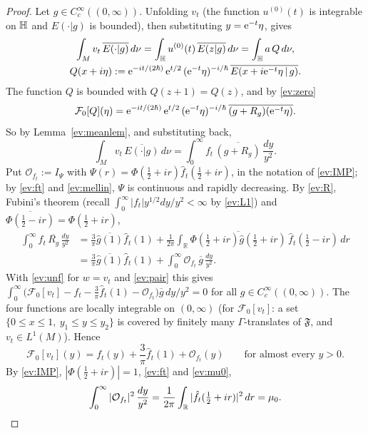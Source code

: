 \begin{proof}
Let $g\in C_c^\infty((0,\infty))$. Unfolding $v_t$ (the function $u^{(0)}(t)$ is integrable on $\mathbb{H}$ and $E(\cdot|g)$ is bounded), then substituting
$y=\mathrm{e}^{-t}\eta$, gives
\begin{gather*}
  \int_Mv_t\,\overline{E(\cdot|g)}\,d\nu=\int_{\mathbb{H}} u^{(0)}(t)\,\overline{E(z|g)}\,d\nu=\int_{\mathbb{H}} a\,Q\,d\nu,\\
  Q(x+i\eta):=\mathrm{e}^{-it/(2\hbar)}\,\mathrm{e}^{t/2}\,(\mathrm{e}^{-t}\eta)^{-i/\hbar}\,\overline{E(x+i\mathrm{e}^{-t}\eta\,|\,g)} .
\end{gather*}
The function $Q$ is bounded with $Q(z+1)=Q(z)$, and by \eqref{ev:zero}
\[
  \mathcal F_0[Q](\eta)=\mathrm{e}^{-it/(2\hbar)}\,\mathrm{e}^{t/2}\,(\mathrm{e}^{-t}\eta)^{-i/\hbar}\,\overline{(g+R_g)(\mathrm{e}^{-t}\eta)} .
\]
So by
Lemma~\ref{ev:meanlem}, and substituting back,
\begin{equation}\label{ev:pair}
  \int_Mv_t\,\overline{E(\cdot|g)}\,d\nu=\int_0^\infty f_t\,\overline{(g+R_g)}\,\frac{dy}{y^2}.
\end{equation}
Put $\mathcal O_{f_t}:=I_\Psi$ with $\Psi(r)=\Phi(\tfrac12+ir)\hat f_t(\tfrac12+ir)$, in the notation of \eqref{ev:IMP}; by \eqref{ev:ft} and \eqref{ev:mellin}, $\Psi$ is continuous and
rapidly decreasing. By \eqref{ev:R}, Fubini's theorem (recall $\int_0^\infty|f_t|y^{1/2}dy/y^2<\infty$ by \eqref{ev:L1}) and $\overline{\Phi(\tfrac12-ir)}=\Phi(\tfrac12+ir)$,
\begin{align*}
  \int_0^\infty f_t\,\overline{R_g}\,\frac{dy}{y^2}&=\frac3\pi\overline{\hat g(1)}\hat f_t(1)+\frac1{2\pi}\int_{\mathbb R}\overline{\Phi(\tfrac12+ir)\hat g(\tfrac12+ir)}\,\hat f_t(\tfrac12-ir)\,dr\\
  &=\frac3\pi\overline{\hat g(1)}\hat f_t(1)+\int_0^\infty\mathcal O_{f_t}\,\overline g\,\frac{dy}{y^2}.
\end{align*}
With \eqref{ev:unf} for $w=v_t$ and \eqref{ev:pair} this gives
$\int_0^\infty\bigl(\mathcal F_0[v_t]-f_t-\tfrac3\pi\hat f_t(1)-\mathcal O_{f_t}\bigr)\overline g\,dy/y^2=0$ for all $g\in C_c^\infty((0,\infty))$. The four functions are locally
integrable on $(0,\infty)$ (for $\mathcal F_0[v_t]$: a set $\{0\le x\le1,\ y_1\le y\le y_2\}$ is covered by finitely many $\Gamma$-translates of $\mathfrak F$, and
$v_t\in L^1(M)$). Hence
\begin{equation}\label{ev:c0}
  \mathcal F_0[v_t](y)=f_t(y)+\frac3\pi\hat f_t(1)+\mathcal O_{f_t}(y)\qquad\text{for almost every }y>0 .
\end{equation}
By \eqref{ev:IMP}, $|\Phi(\tfrac12+ir)|=1$, \eqref{ev:ft} and \eqref{ev:mu0},
\begin{equation}\label{ev:Onorm}
  \int_0^\infty|\mathcal O_{f_t}|^2\,\frac{dy}{y^2}=\frac1{2\pi}\int_{\mathbb R}|\hat f_t(\tfrac12+ir)|^2\,dr=\mu_0 .
\qedhere
\end{equation}


\end{proof}

